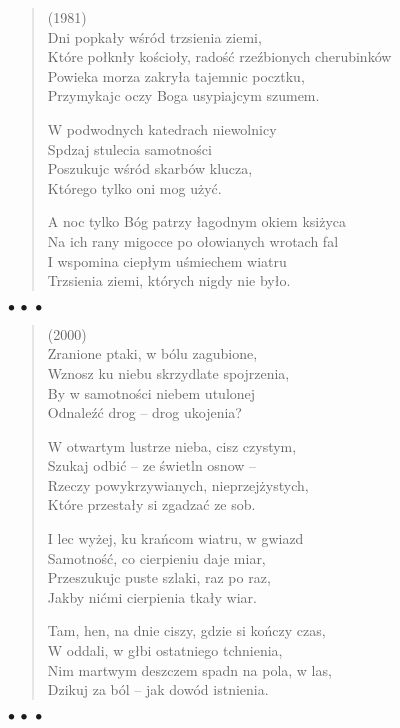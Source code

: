 \documentclass{article} %
\newenvironment{wierszd}[2]
	{\begin{verse} \hspace*{-1em}{\bf #1}\hfill{\small{(#2)}}\\[.5ex] }
	{\end{verse} \begin{center}$\bullet\ \bullet\ \bullet$\end{center}}
\newcommand{\e}{\eob}
\renewcommand{\a}{\aob}
\renewcommand{\o}{\'{o}}
\newcommand{\z}{\'{z}}
\newcommand{\n}{\'{n}}
\newcommand{\s}{\'{s}}
\newcommand{\ci}{\'{c}}
\begin{document}
\begin{wierszd} {Niewolnicy}{1981}
Dni pop{\e}ka{\l}y w{\s}r{\o}d trz{\e}sienia ziemi, \\ 
Kt{\o}re po{\l}kn{\e}{\l}y ko{\s}cio{\l}y, rado{\s}{\ci} rze{\z}bionych cherubink{\o}w \\ 
Powieka morza zakry{\l}a tajemnic{\e} pocz{\a}tku, \\ 
Przymykaj{\a}c oczy Boga usypiaj{\a}cym szumem. 
 
	W podwodnych katedrach niewolnicy \\ 
	Sp{\e}dzaj{\a} stulecia samotno{\s}ci \\ 
	Poszukuj{\a}c w{\s}r{\o}d skarb{\o}w klucza, \\ 
	Kt{\o}rego tylko oni mog{\a} u\.{z}y{\ci}. 

A noc{\a} tylko B{\o}g patrzy {\l}agodnym okiem ksi{\e}\.{z}yca \\ 
Na ich rany migoc{\a}ce po o{\l}owianych wrotach fal \\ 
I wspomina ciep{\l}ym u{\s}miechem wiatru \\ 
Trz{\e}sienia ziemi, kt{\o}rych nigdy nie by{\l}o.

\end{wierszd}

\begin{wierszd}{}{2000}
Zranione ptaki, w b{\o}lu zagubione,\\
Wznosz{\a} ku niebu skrzydlate spojrzenia,\\
By w samotno{\s}ci niebem utulonej\\
Odnale{\z}{\ci} drog{\e} -- drog{\e} ukojenia?

W otwartym lustrze nieba, cisz{\a} czystym,\\
Szukaj{\a} odbi{\ci} -- ze {\s}wietln{\a} osnow{\a} -- \\
Rzeczy powykrzywianych, nieprzej\.{z}ystych,\\
Kt{\o}re przesta{\l}y si{\e} zgadza{\ci} ze sob{\a}.

I lec{\a} wy\.{z}ej, ku kra{\n}com wiatru, w gwiazd\\
Samotno{\s}{\ci}, co cierpieniu daje miar{\e},\\
Przeszukuj{\a}c puste szlaki, raz po raz, \\
Jakby ni{\ci}mi cierpienia tka{\l}y wiar{\e}.

Tam, hen, na dnie ciszy, gdzie si{\e} ko{\n}czy czas,\\
W oddali, w g{\l}{\e}bi ostatniego tchnienia,\\
Nim martwym deszczem spadn{\a} na pola, w las,\\
Dzi{\e}kuj{\a} za b{\o}l -- jak dow{\o}d istnienia.
\end{wierszd}
\end{document}

